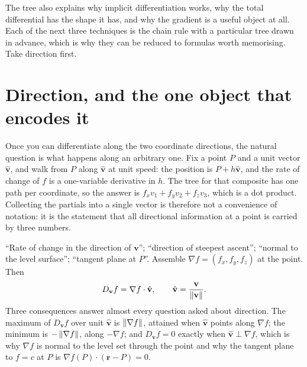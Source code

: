 The tree also explains why implicit differentiation works, why the total differential has the shape it has, and why the gradient is a useful object at all. Each of the next three techniques is the chain rule with a particular tree drawn in advance, which is why they can be reduced to formulas worth memorising. Take direction first.

\section{Direction, and the one object that encodes it}

Once you can differentiate along the two coordinate directions, the natural question is what happens along an arbitrary one. Fix a point $P$ and a unit vector $\hat{\mathbf v}$, and walk from $P$ along $\hat{\mathbf v}$ at unit speed: the position is $P+h\hat{\mathbf v}$, and the rate of change of $f$ is a one-variable derivative in $h$. The tree for that composite has one path per coordinate, so the answer is $f_{x}v_{1}+f_{y}v_{2}+f_{z}v_{3}$, which is a dot product. Collecting the partials into a single vector is therefore not a convenience of notation: it is the statement that all directional information at a point is carried by three numbers.

\cue ``Rate of change in the direction of $\mathbf v$''; ``direction of steepest ascent''; ``normal to the level surface''; ``tangent plane at $P$''.
\method Assemble $\nabla f=(f_{x},f_{y},f_{z})$ at the point. Then
\[
D_{\mathbf v}f=\nabla f\cdot\hat{\mathbf v},\qquad \hat{\mathbf v}=\frac{\mathbf v}{\left\lVert \mathbf v\right\rVert} .
\]
Three consequences answer almost every question asked about direction. The maximum of $D_{\mathbf v}f$ over unit $\hat{\mathbf v}$ is $\left\lVert \nabla f\right\rVert$, attained when $\hat{\mathbf v}$ points along $\nabla f$; the minimum is $-\left\lVert \nabla f\right\rVert$, along $-\nabla f$; and $D_{\mathbf v}f=0$ exactly when $\hat{\mathbf v}\perp\nabla f$, which is why $\nabla f$ is normal to the level set through the point and why the tangent plane to $f=c$ at $P$ is $\nabla f(P)\cdot(\mathbf r-P)=0$.

